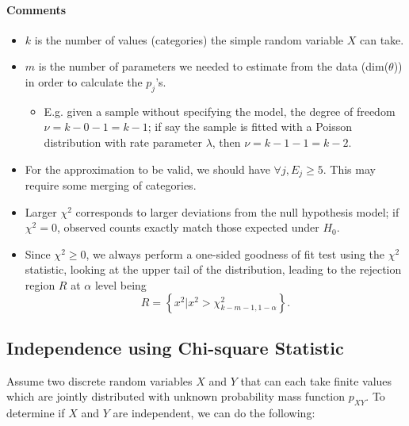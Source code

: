 \documentclass[12pt]{report}
\theoremstyle{definition}
\begin{document}
\paragraph{Comments}
\begin{itemize}
    \item $k$ is the number of values (categories) the simple random variable
        $X$ can take.
    \item $m$ is the number of parameters we needed to estimate from the data
        (dim($\theta$)) in order to calculate the $p_j$'s.
        \begin{itemize}
            \item E.g. given a sample without specifying the model, the degree
                of freedom $\nu=k-0-1=k-1$; if say the sample is fitted with a
                Poisson distribution with rate parameter $\lambda$, then
                $\nu=k-1-1=k-2$.
        \end{itemize} 
    \item For the approximation to be valid, we should have $\forall j,E_j\ge 5$.
        This may require some merging of categories.
    \item Larger $\chi^2$ corresponds to larger deviations from the null
        hypothesis model; if $\chi^2=0$, observed counts exactly match those
        expected under $H_0$.
    \item Since $\chi^2\ge 0$, we always perform a one-sided goodness of fit
        test using the $\chi^2$ statistic, looking at the upper tail of the
        distribution, leading to the rejection region $R$ at $\alpha$ level being
        \[
            R=\left\{x^{2}|x^{2}>\chi^2_{k-m-1,1-\alpha}\right\}.
        \]
\end{itemize} 

\subsection{Independence using Chi-square Statistic}

Assume two discrete random variables $X$ and $Y$ that can each take finite
values which are jointly distributed with unknown probability mass function
$p_{XY}$. To determine if $X$ and $Y$ are independent, we can do the following:
\end{document}
